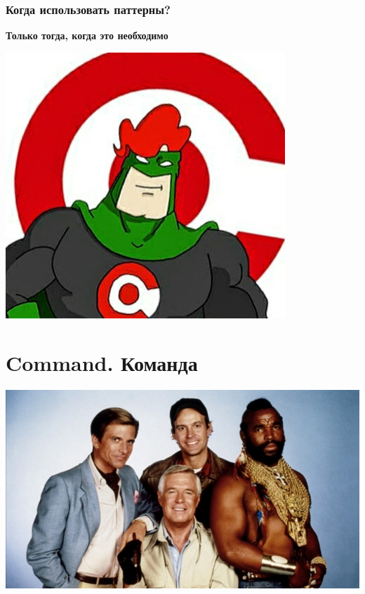 \documentclass[russian,aspectratio=169,14pt]{beamer}
\begin{document}
\begin{frame}
	\frametitle{Когда использовать паттерны?}
	\textbf{Только тогда, когда это необходимо}
	\begin{center}
	\includegraphics[height=0.6\textheight]{ko.jpg}
	\end{center}
\end{frame}




\section{Command. Команда}

\begin{frame}
    \begin{center}
	\includegraphics[height=0.8\textheight]{command.jpg}
	\end{center}
\end{frame}
\end{document}
